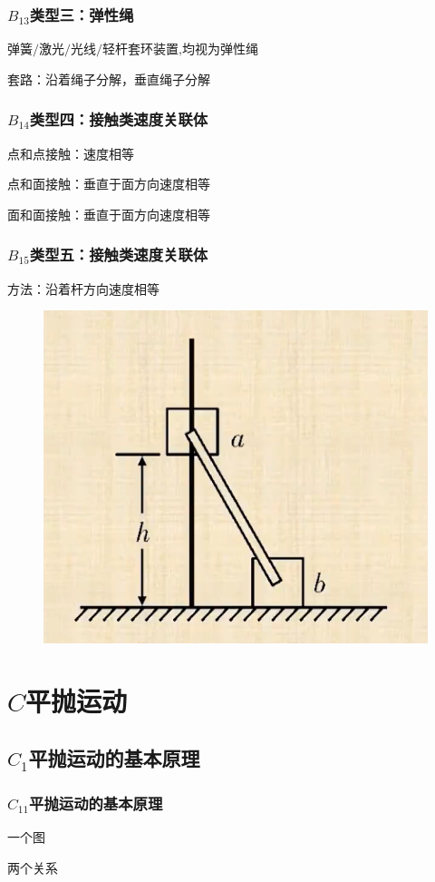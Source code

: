 \documentclass[lang=cn,10pt]{elegantbook}
\begin{document}
        \subsubsection{$B_{13}$类型三：弹性绳}
        
        $ \text{弹簧/激光/光线/轻杆套环装置,均视为弹性绳}$
        
        套路：沿着绳子分解，垂直绳子分解
        \vspace{3cm}
        \subsubsection{$B_{14}$类型四：接触类速度关联体}
        
        点和点接触：速度相等
        
        点和面接触：垂直于面方向速度相等
        
        面和面接触：垂直于面方向速度相等
        \subsubsection{$B_{15}$类型五：接触类速度关联体}
        方法：沿着杆方向速度相等
        \begin{figure}[H]
        	\centering
        	\includegraphics[width=0.34\linewidth]{image/45}
        \end{figure}
        \section{$C$平抛运动}
        \subsection{$C_1$平抛运动的基本原理}
        \subsubsection{$C_11$平抛运动的基本原理}
        一个图
        \vspace{2cm}
        
        两个关系
        \vspace{2cm}
        
\end{document}
